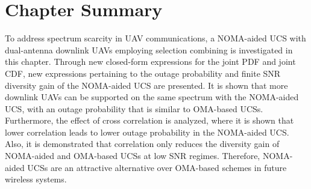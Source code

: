 \section{Chapter Summary} \label{NOMA_bivariate_Rician_Shadowed_sec_conclusion}
To address spectrum scarcity in UAV communications, a NOMA-aided UCS with dual-antenna downlink UAVs employing selection combining is investigated in this chapter. Through new closed-form expressions for the joint PDF and joint CDF, new expressions pertaining to the outage probability and finite SNR diversity gain of the NOMA-aided UCS are presented. It is shown that more downlink UAVs can be supported on the same spectrum with the NOMA-aided UCS, with an outage probability that is similar to OMA-based UCSs. Furthermore, the effect of cross correlation is analyzed, where it is shown that lower correlation leads to lower outage probability in the NOMA-aided UCS. Also, it is demonstrated that correlation only reduces the diversity gain of NOMA-aided and OMA-based UCSs at low SNR regimes. Therefore, NOMA-aided UCSs are an attractive alternative over OMA-based schemes in future wireless systems.




